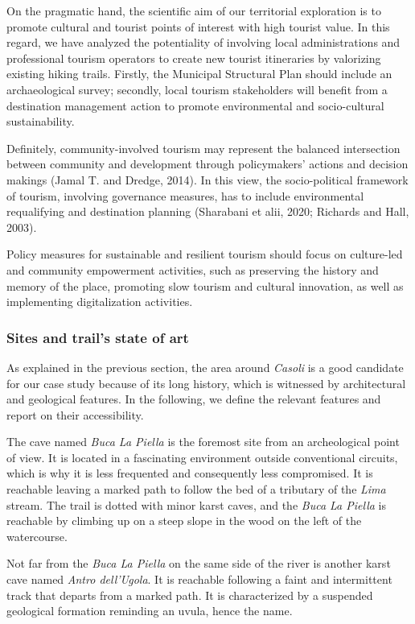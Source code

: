 \documentclass[sustainability,article,submit,pdftex,moreauthors]{Definitions/mdpi}
\begin{document}
On the pragmatic hand, the scientific aim of our territorial exploration is to promote cultural and tourist points of interest with high tourist value. 
In this regard, we have analyzed the potentiality of involving local administrations and professional tourism operators to create new tourist itineraries by valorizing existing hiking trails.
Firstly, the Municipal Structural Plan should include an archaeological survey; secondly, local tourism stakeholders will benefit from a destination management action to promote environmental and socio-cultural sustainability. 

Definitely, community-involved tourism may represent the balanced intersection between community and development through policymakers' actions and decision makings (Jamal T. and Dredge, 2014). 
In this view, the socio-political framework of tourism, involving governance measures, has to include environmental requalifying and destination planning (Sharabani et alii, 2020; Richards and Hall, 2003). 

Policy measures for sustainable and resilient tourism should focus on culture-led and community empowerment activities, such as preserving the history and memory of the place, promoting slow tourism and cultural innovation, as well as implementing digitalization activities.

\subsubsection{Sites and trail’s state of art}

As explained in the previous section, the area around \emph{Casoli} is a good candidate for our case study because of its long history, which is witnessed by architectural and geological features. In the following, we define the relevant features and report on their accessibility.

The cave named {\em Buca La Piella} is the foremost site from an archeological point of view. It is located in a fascinating environment outside conventional circuits, which is why it is less frequented and consequently less compromised. It is reachable leaving a marked path to follow the bed of a tributary of the \emph{Lima} stream. The trail is dotted with minor karst caves, and the {\em Buca La Piella} is reachable by climbing up on a steep slope in the wood on the left of the watercourse. 

Not far from the {\em Buca La Piella} on the same side of the river is another karst cave named {\em Antro dell'Ugola}. It is reachable following a faint and intermittent track that departs from a marked path. It is characterized by a suspended geological formation reminding an uvula, hence the name.
\end{document}
